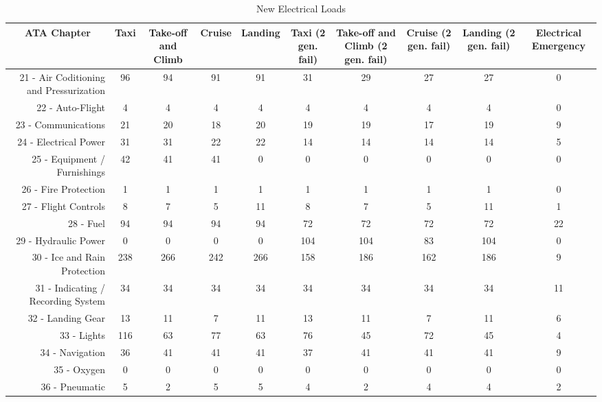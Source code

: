 \begin{table}[htbp]
  \centering
  \caption{New Electrical Loads}
    \begin{tabular}{rccccccccc}
    \toprule
    \multicolumn{1}{c}{ATA Chapter} & Taxi  & Take-off and Climb & Cruise & Landing & Taxi (2 gen. fail) & Take-off and Climb (2 gen. fail) & Cruise  (2 gen. fail) & Landing  (2 gen. fail) & Electrical Emergency \\
    \midrule
    21 - Air Coditioning and Pressurization & 96    & 94    & 91    & 91    & 31    & 29    & 27    & 27    & 0 \\
    22 - Auto-Flight & 4     & 4     & 4     & 4     & 4     & 4     & 4     & 4     & 0 \\
    23 - Communications & 21    & 20    & 18    & 20    & 19    & 19    & 17    & 19    & 9 \\
    24 - Electrical Power & 31    & 31    & 22    & 22    & 14    & 14    & 14    & 14    & 5 \\
    25 - Equipment / Furnishings & 42    & 41    & 41    & 0     & 0     & 0     & 0     & 0     & 0 \\
    26 - Fire Protection & 1     & 1     & 1     & 1     & 1     & 1     & 1     & 1     & 0 \\
    27 - Flight Controls & 8     & 7     & 5     & 11    & 8     & 7     & 5     & 11    & 1 \\
    28 - Fuel & 94    & 94    & 94    & 94    & 72    & 72    & 72    & 72    & 22 \\
    29 - Hydraulic Power & 0     & 0     & 0     & 0     & 104   & 104   & 83    & 104   & 0 \\
    30 - Ice and Rain Protection & 238   & 266   & 242   & 266   & 158   & 186   & 162   & 186   & 9 \\
    31 - Indicating / Recording System & 34    & 34    & 34    & 34    & 34    & 34    & 34    & 34    & 11 \\
    32 - Landing Gear & 13    & 11    & 7     & 11    & 13    & 11    & 7     & 11    & 6 \\
    33 - Lights & 116   & 63    & 77    & 63    & 76    & 45    & 72    & 45    & 4 \\
    34 - Navigation & 36    & 41    & 41    & 41    & 37    & 41    & 41    & 41    & 9 \\
    35 - Oxygen & 0     & 0     & 0     & 0     & 0     & 0     & 0     & 0     & 0 \\
    36 - Pneumatic & 5     & 2     & 5     & 5     & 4     & 2     & 4     & 4     & 2 \\

\end{tabular}
\end{table}
